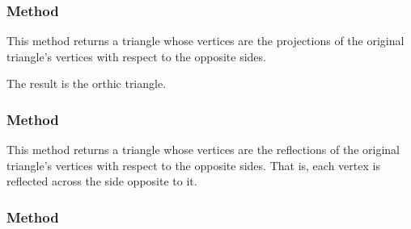 \subsubsection{Method }
\label{ssub:method_triangle_projection}
This method returns a triangle whose vertices are the projections of the original triangle's vertices with respect to the opposite sides.

The result is the orthic triangle.

\begin{tkzexample}[latex=.5\textwidth]
\begin{center}
\end{center}
\end{tkzexample}


\subsubsection{Method }
\label{ssub:method_triangle_reflection}

This method returns a triangle whose vertices are the reflections of the original triangle's vertices with respect to the opposite sides. That is, each vertex is reflected across the side opposite to it.

\begin{tkzexample}[latex=.5\textwidth]
\end{tkzexample}

\subsubsection{Method }
\label{ssub:method_triangle_circumcevian}

